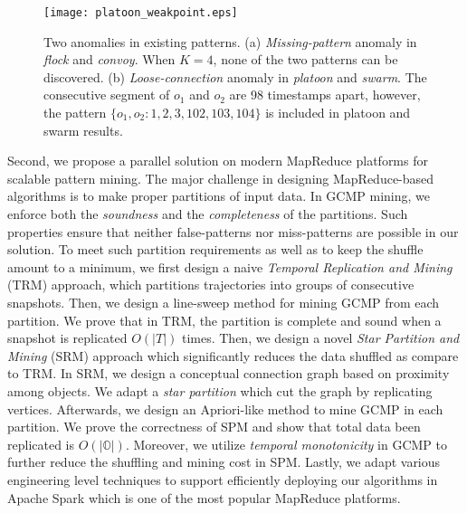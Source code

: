 %
\begin{figure}[h]
\center
\texttt{[image: platoon\_weakpoint.eps]}
\caption{Two anomalies in existing patterns. (a) \emph{Missing-pattern} anomaly
in \emph{flock} and \emph{convoy}. When $K=4$, none of the two patterns can be discovered. (b) \emph{Loose-connection} anomaly in \emph{platoon} and \emph{swarm}. The consecutive segment of $o_1$ and $o_2$ are 98 timestamps apart, however, the pattern $\{o_1, o_2: 1,2,3,102,103,104\}$ is included in platoon and swarm results.}
\label{fig:platoon_weakpoint}
\end{figure}
 
Second, we propose a parallel solution on modern MapReduce platforms for scalable pattern mining.
The major challenge in designing MapReduce-based algorithms is to make proper partitions of input data.
In GCMP mining, we enforce both the \emph{soundness} and the \emph{completeness} 
of the partitions. Such properties ensure that neither false-patterns 
nor miss-patterns are possible in our solution. To meet such partition requirements
as well as to keep the shuffle amount to a minimum,
% 
%
we first design a naive \emph{Temporal Replication and Mining} (TRM)
approach, which partitions trajectories into groups of consecutive snapshots. Then, we design a line-sweep
method for mining GCMP from each partition. We prove that in TRM, the partition is complete and sound when a snapshot is replicated $O(|T|)$ times. 
Then, we design a novel \emph{Star Partition and Mining} (SRM) approach which significantly reduces the data shuffled
as compare to TRM. In SRM, we design a conceptual connection graph based on proximity among objects. We adapt
a \emph{star partition} which cut the graph by replicating vertices. Afterwards, we design an Apriori-like method to mine
GCMP in each partition. We prove the correctness of SPM and show that total data been replicated is $O(|\mathbb{O}|)$.
Moreover, we utilize \emph{temporal monotonicity} in GCMP to further reduce the shuffling and mining cost in SPM. Lastly, we adapt various engineering level techniques to support efficiently deploying our algorithms in 
Apache Spark which is one of the most popular MapReduce platforms.

